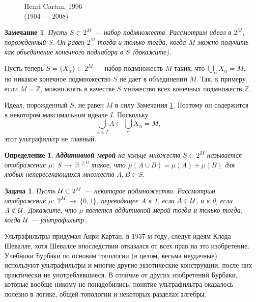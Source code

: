 \documentclass[12pt]{book}
\newcommand{\arrow}{{\:\longrightarrow\:}}
\def\Z{{\mathbb Z}}
\def\R{{\mathbb R}}
\theoremstyle{upshape}
\newtheorem{zadacha}{Задача}[chapter]
\theoremstyle{generic}
\newtheorem{opredelenie}[teorema]{Определение}
\newtheorem{remark}[teorema]{Замечание}
\def\замечание{\begin{remark}}
\def\еза{\end{remark}}
\theoremstyle{upshapenonumber}
\newcommand{\следствие}{%
     \refstepcounter{teorema}
     {\noindent\bf Следствие \thechapter.\arabic{teorema}:\ }}
\newcommand{\пример}{%
     \refstepcounter{teorema}
     {\noindent\bf Пример \thechapter.\arabic{teorema}:\ }}
\newcommand{\лемма}{%
     \refstepcounter{teorema}
     {\noindent\bf Лемма \thechapter.\arabic{teorema}:\ }}
\newcommand{\теорема}{%
     \refstepcounter{teorema}
     {\noindent\bf Теорема \thechapter.\arabic{teorema}:\ }}
\newcommand{\утверждение}{%
     \refstepcounter{teorema}
     {\noindent\bf Утверждение \thechapter.\arabic{teorema}:\ }}
\def\бф{\bf}
\def\ем{\em}
\def\задача{\begin{zadacha}}
\def\ез{\end{zadacha}}
\def\еу{\end{ukazanie}}
\def\определение{\begin{opredelenie}}
\def\ео{\end{opredelenie}}
\def\енум{\begin{enumerate}}
\def\ее{\end{enumerate}}
\begin{document}
\begin{figure}[ht]
\begin{center}\ \\
\\
{\small Henri Cartan, 1996 \\
(1904 --- 2008)}
\end{center}
\end{figure}



\замечание\label{_ideal_podmno_Zamechanie_}
Пусть $S\subset 2^M$ --- набор подмножеств.
Рассмотрим идеал в $2^M$, порожденный $S$.
Он равен $2^M$ тогда и только тогда, когда 
$M$ можно получить как объединение конечного 
поднабора в $S$ (докажите).
\еза


Пусть теперь $S=\{X_\alpha\}\subset 2^M$ --- набор подмножеств
$M$ таких, что $\bigcup_\alpha X_\alpha = M$, но никакое конечное
подмножество $S$ не дает в объединении $M$. Так, к
примеру, если $M= \Z$, можно взять в качестве $S$
множество всех конечных подмножеств $\Z$.



Идеал, порожденный $S$, не равен $M$ в силу 
Замечания \ref{_ideal_podmno_Zamechanie_}.
Поэтому он содержится в некотором максимальном
идеале $I$. Поскольку 
\[ 
 \bigcup_{A\in I} A \subset \bigcup_\alpha X_\alpha = M,
\]
этот ультрафильтр не главный.



\определение
{\бф Аддитивной мерой} на кольце множеств 
$S\subset 2^M$ называется отображение
$\mu:\; S \arrow \R^{\geq 0}$ такое, что 
$\mu (A \cup B) = \mu(A) + \mu(B)$ для любых
непересекающихся множеств $A, B \in S$.
\ео

\задача
Пусть ${\cal U} \subset 2^M$ --- некоторое подмножество. 
Рассмотрим отображение $\mu:\; 2^M \arrow \{0,1\}$,
переводящее $A$ в 1, если $A\in {\cal U}$, и в 0,
если $A\notin {\cal U}$. Докажите, что 
$\mu$ является аддитивной мерой тогда и только
тогда, когда ${\cal U}$ --- ультрафильтр.
\ез


Ультрафильтры придумал Анри Картан, в 1937-м году,
следуя идеям Клода Шевалле, хотя Шевалле впоследствии отказался
от всех прав на это изобретение. Учебники Бурбаки по основам 
топологии (в целом, весьма неудачные) используют ультрафильтры
и многие другие экзотические конструкции, после них 
практически не употреблявшиеся. В отличие от других
изобретений Бурбаки, которые вообще никому не
понадобились, понятие ультрафильтра оказалось
полезно в логике, общей топологии и некоторых 
разделах алгебры.
\end{document}
